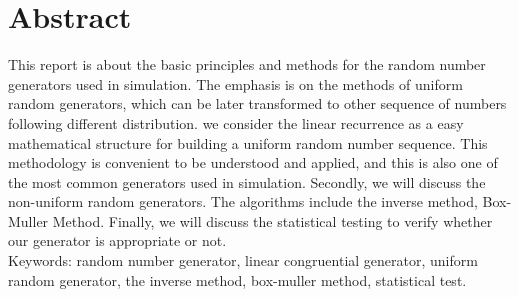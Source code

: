 \section*{Abstract}

This report is about the basic principles and methods for the random number generators used in simulation. The emphasis is on the methods of uniform random generators, which can be later transformed to other sequence of numbers following different distribution. we consider the linear recurrence as a easy mathematical structure for building a uniform random number sequence. This methodology is convenient to be understood and applied, and this is also one of the most common generators used in simulation. Secondly, we will discuss 
the non-uniform random generators. The algorithms include the inverse method, Box-Muller Method. Finally, we will discuss the statistical testing to verify whether our generator is appropriate or not.\\

Keywords: random number generator, linear congruential generator, uniform random generator, the inverse method, box-muller method, statistical test. \\